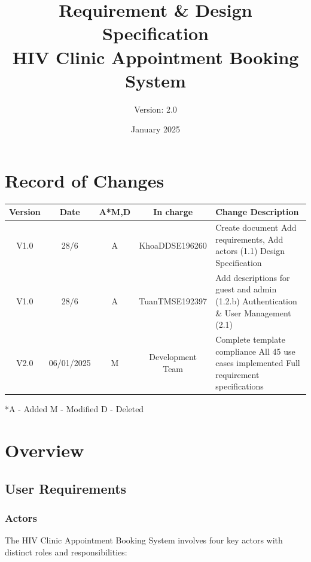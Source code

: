 \documentclass[12pt,a4paper]{article}
\title{\textbf{Requirement \& Design Specification\\HIV Clinic Appointment Booking System}}
\author{Version: 2.0}
\date{January 2025}
\begin{document}
\maketitle
\thispagestyle{empty}

\newpage

\section*{Record of Changes}

\begin{table}[h!]
\centering
\renewcommand{\arraystretch}{1.5}
\begin{tabular}{|c|c|c|c|p{7.5cm}|}
\hline
\textbf{Version} & \textbf{Date} & \textbf{A*M,D} & \textbf{In charge} & \textbf{Change Description} \\
\hline
V1.0 & 28/6 & A & KhoaDDSE196260 & 
Create document \newline
Add requirements, Add actors (1.1) \newline
Design Specification\\
\hline
V1.0 & 28/6 & A & TuanTMSE192397 & 
Add descriptions for guest and admin (1.2.b) \newline
Authentication \& User Management (2.1) \\
\hline
V2.0 & 06/01/2025 & M & Development Team & 
Complete template compliance \newline
All 45 use cases implemented \newline
Full requirement specifications \\
\hline
\end{tabular}
\end{table}

*A - Added M - Modified D - Deleted

\newpage
\tableofcontents
\newpage

\section{Overview}

\subsection{User Requirements}

\subsubsection{Actors}

The HIV Clinic Appointment Booking System involves four key actors with distinct roles and responsibilities:
\end{document}
